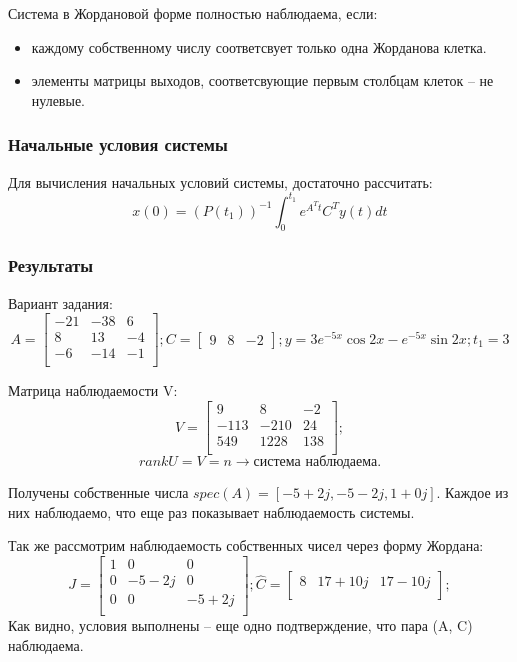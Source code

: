 Система в Жордановой форме полностью наблюдаема, если:
\begin{itemize}
    \item каждому собственному числу соответсвует только одна Жорданова клетка. 
    \item элементы матрицы выходов, соответсвующие первым столбцам клеток -- не нулевые.
\end{itemize}

\subsubsection{Начальные условия системы}
Для вычисления начальных условий системы, достаточно рассчитать:
\[x(0) = (P(t_1))^{-1} \int_{0}^{t_1} e^{A^T t} C^T y(t) dt\]


\subsubsection{Результаты}
Вариант задания:
\[ A = \begin{bmatrix}
        -21 & -38 & 6 \\
        8 & 13 & -4 \\
        -6 & -14 & -1 \\
        \end{bmatrix}; 
        C = \begin{bmatrix}
                9  & 8 & -2
                \end{bmatrix}; 
        y = 3 e^{-5x}\cos{2x} - e^{-5x}\sin{2x}; 
        t_1 = 3
\]

Матрица наблюдаемости V:
\[ V = \begin{bmatrix}
        9 & 8 & -2 \\
        -113 & -210 & 24 \\
        549 & 1228 & 138 \\
        \end{bmatrix};
\]
\[rankU = V = n \rightarrow \text{система наблюдаема.}\]

Получены собственные числа \(spec(A) = [-5 + 2j, -5 - 2j, 1+0j]\). Каждое из них наблюдаемо, что еще раз показывает наблюдаемость системы.

Так же рассмотрим наблюдаемость собственных чисел через форму Жордана:
\[
        J = \begin{bmatrix}
                1 & 0 & 0 \\
                0 & -5 - 2j & 0 \\
                0 & 0 & -5 + 2j \\
                \end{bmatrix};
        \hat{C} = \begin{bmatrix}
                8 &
                17 + 10j &
                17 - 10j \\
                \end{bmatrix};
\]
Как видно, условия выполнены -- еще одно подтверждение, что пара (A, C) наблюдаема.

